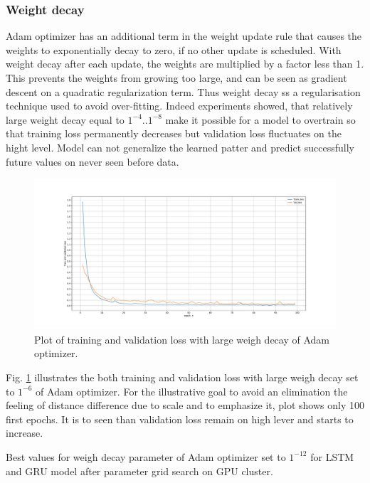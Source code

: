 \subsubsection{Weight decay}
Adam optimizer has an additional term in the weight update rule that causes the weights to exponentially decay to zero, if no other update is scheduled. With weight decay after each update, the weights are multiplied by a factor less than 1. This prevents the weights from growing too large, and can be seen as gradient descent on a quadratic regularization term. Thus weight decay ss a regularisation technique used to avoid over-fitting. Indeed experiments showed, that relatively large weight decay equal to $1^{-4} .. 1^{-8}$ make it possible for a model to overtrain so that training loss permanently decreases but validation loss fluctuates on the hight level. Model can not generalize the learned patter and predict successfully future values on  never seen before data. 
\begin{figure}[htb]
	\begin{center}
		\includegraphics[width=1\textwidth, keepaspectratio]{gfx/lstm1_weight_decay_high.pdf}
		\caption{\label{fig:wd} Plot of training and validation loss with large weigh decay of Adam optimizer.}
	\end{center}
\end{figure}

Fig. \ref{fig:wd} illustrates the both training and validation loss with large weigh decay set to $1^{-6}$ of Adam optimizer. For the illustrative goal to avoid an elimination the feeling of distance difference due to scale and to emphasize it, plot shows only 100 first epochs. It is to seen than validation loss remain on high lever and starts to increase.  

Best values for weigh decay parameter of Adam optimizer set to  $1^{-12}$ for LSTM and GRU model after parameter grid search on GPU cluster. 

